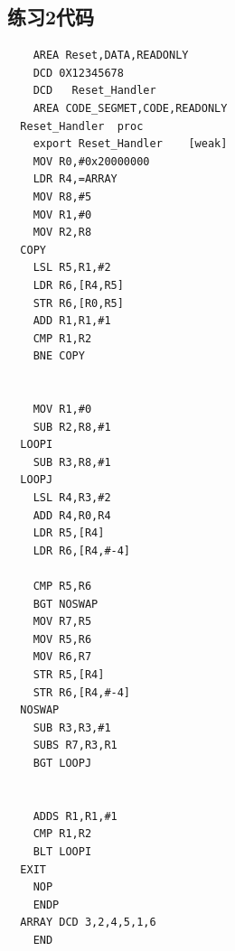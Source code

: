 \documentclass[a4paper,10pt,UTF8]{paper}
\numberwithin{equation}{section}
\numberwithin{figure}{section}
\begin{document}
\subsection{练习2代码}
\begin{verbatim}
    AREA Reset,DATA,READONLY
    DCD 0X12345678
    DCD   Reset_Handler
    AREA CODE_SEGMET,CODE,READONLY
  Reset_Handler  proc
    export Reset_Handler    [weak]
    MOV R0,#0x20000000
    LDR R4,=ARRAY
    MOV R8,#5
    MOV R1,#0
    MOV R2,R8
  COPY
    LSL R5,R1,#2
    LDR R6,[R4,R5]
    STR R6,[R0,R5]
    ADD R1,R1,#1
    CMP R1,R2
    BNE COPY
    
      
    MOV R1,#0
    SUB R2,R8,#1
  LOOPI
    SUB R3,R8,#1
  LOOPJ
    LSL R4,R3,#2
    ADD R4,R0,R4
    LDR R5,[R4]
    LDR R6,[R4,#-4]

    CMP R5,R6
    BGT NOSWAP
    MOV R7,R5
    MOV R5,R6
    MOV R6,R7
    STR R5,[R4]
    STR R6,[R4,#-4]
  NOSWAP
    SUB R3,R3,#1
    SUBS R7,R3,R1
    BGT LOOPJ


    ADDS R1,R1,#1
    CMP R1,R2
    BLT LOOPI
  EXIT
    NOP
    ENDP
  ARRAY DCD 3,2,4,5,1,6
    END

\end{verbatim}
\end{document}
